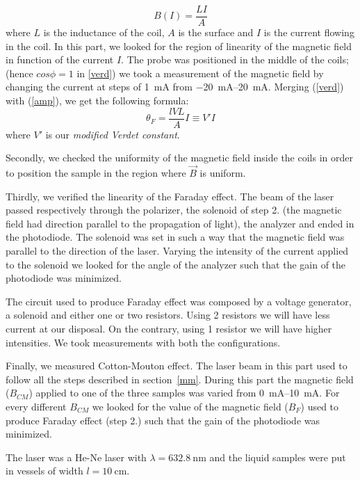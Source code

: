 \documentclass[11pt,a4paper]{article}
\begin{document}
\begin{equation}
B(I)=\frac{LI}{A}\label{amp}
\end{equation}
where $L$ is the inductance of the coil, $A$ is the surface and $I$ is the current flowing in the coil. In this part, we looked for the region of linearity of the magnetic field in function of the current $I$. The probe was positioned in the middle of the coils; (hence $cos\phi=1$ in \ref{verd}) we took a measurement of the magnetic field by changing the current at steps of \SI{1}{\mA} from \SIrange{-20}{+20}{\mA}. Merging (\ref{verd}) with (\ref{amp}), we get the following formula:
\begin{equation}
\theta_F=\frac{lVL}{A}I\equiv V'I\label{modverd}
\end{equation} where $V'$ is our \emph{modified Verdet constant}.

Secondly, we checked the uniformity of the magnetic field inside the coils in order to position the sample in the region where $\vec{B}$ is uniform.

Thirdly, we verified the linearity of the Faraday effect. The beam of the laser passed respectively through the polarizer, the solenoid of step 2. (the magnetic field had direction parallel to the propagation of light), the analyzer and ended in the photodiode. The solenoid was set in such a way that the magnetic field was parallel to the direction of the laser. Varying the intensity of the current applied to the solenoid we looked for the angle of the analyzer such that the gain of the photodiode was minimized.

The circuit used to produce Faraday effect was composed by a voltage generator, a solenoid and either one or two resistors. Using 2 resistors we will have less current at our disposal. On the contrary, using 1 resistor we will have higher intensities. We took measurements with both the configurations.

Finally, we measured Cotton-Mouton effect. The laser beam in this part used to follow all the steps described in section~\ref{mm}. During this part the magnetic field ($B_{CM}$) applied to one of the three samples was varied from \SIrange{0}{10}{\mA}. For every different $B_{CM}$ we looked for the value of the magnetic field ($B_F$) used to produce Faraday effect (step 2.) such that the gain of the photodiode was minimized.

The laser was a He-Ne laser with $\lambda=\SI{632.8}{\nm}$ and the liquid samples were put in vessels of width $l=\SI{10}{\cm}$.
\end{document}

